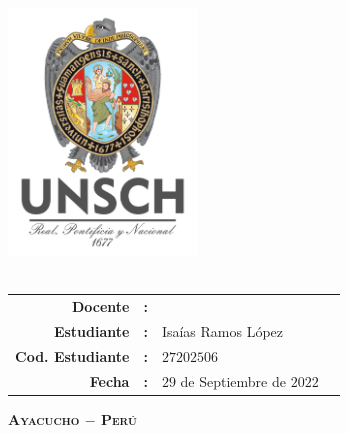 \thispagestyle{empty}
\phantom{dy}
\begin{center}
	{\Large\scshape\bfseries \dyuniversity}\\
	\vspace{2.5mm}
	{\Large\scshape\bfseries \dyfaculty}\\
	\vspace{2.5mm}
	{\Large\scshape\bfseries \dydept}\\
	\vspace{8mm}
	\includegraphics[width=5cm]{Images/logo/logounsch_a.png}\\
	\vspace{2pt}
	{\Large\bfseries \dycourse}\\
	\vspace{2pt}
	\vspace{0.7cm}{\underline{\Large\bfseries\vphantom{dy}\dytitle}}
	\vspace{5pt}

	\boxabstractd{10cm}{\bfseries\large\centering \dytema}
	\vspace{1cm}
	\begin{center}
		\begin{tabular}{rcll}
			\toprule
			\bf Docente         & \bf: & \dyteacher{}                 & \\[5pt]
			\bf Estudiante      & \bf: & Isaías Ramos López           & \\[5pt]
			\bf Cod. Estudiante & \bf: & $27202506$                   & \\[5pt]
			\bf Fecha           & \bf: & $29$ de Septiembre de $2022$ & \\
			\bottomrule
		\end{tabular}
	\end{center}

	\vfill
	{\Large\scshape\bfseries Ayacucho $-$ Perú}\\
	\vspace{4mm} {\Large\bfseries\dycopyrightyear}
\end{center}

\cleardoublepage{}